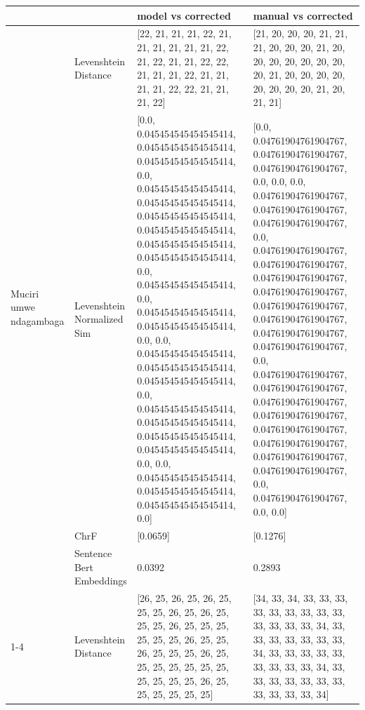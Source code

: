 \begin{tabular}{llll}
\toprule
 &  & model vs corrected & manual vs corrected \\
\midrule
\multirow[t]{4}{*}{Muciri umwe ndagambaga} & Levenshtein Distance & [22, 21, 21, 21, 22, 21, 21, 21, 21, 21, 21, 22, 21, 22, 21, 21, 22, 22, 21, 21, 21, 22, 21, 21, 21, 21, 22, 22, 21, 21, 21, 22] & [21, 20, 20, 20, 21, 21, 21, 20, 20, 20, 21, 20, 20, 20, 20, 20, 20, 20, 20, 21, 20, 20, 20, 20, 20, 20, 20, 20, 21, 20, 21, 21] \\
 & Levenshtein Normalized Sim & [0.0, 0.045454545454545414, 0.045454545454545414, 0.045454545454545414, 0.0, 0.045454545454545414, 0.045454545454545414, 0.045454545454545414, 0.045454545454545414, 0.045454545454545414, 0.045454545454545414, 0.0, 0.045454545454545414, 0.0, 0.045454545454545414, 0.045454545454545414, 0.0, 0.0, 0.045454545454545414, 0.045454545454545414, 0.045454545454545414, 0.0, 0.045454545454545414, 0.045454545454545414, 0.045454545454545414, 0.045454545454545414, 0.0, 0.0, 0.045454545454545414, 0.045454545454545414, 0.045454545454545414, 0.0] & [0.0, 0.04761904761904767, 0.04761904761904767, 0.04761904761904767, 0.0, 0.0, 0.0, 0.04761904761904767, 0.04761904761904767, 0.04761904761904767, 0.0, 0.04761904761904767, 0.04761904761904767, 0.04761904761904767, 0.04761904761904767, 0.04761904761904767, 0.04761904761904767, 0.04761904761904767, 0.04761904761904767, 0.0, 0.04761904761904767, 0.04761904761904767, 0.04761904761904767, 0.04761904761904767, 0.04761904761904767, 0.04761904761904767, 0.04761904761904767, 0.04761904761904767, 0.0, 0.04761904761904767, 0.0, 0.0] \\
 & ChrF & [0.0659] & [0.1276] \\
 & Sentence Bert Embeddings & 0.0392 & 0.2893 \\
\cline{1-4}
\multirow[t]{4}{*}{Itheru ritirutagirwo mugui} & Levenshtein Distance & [26, 25, 26, 25, 26, 25, 25, 25, 26, 25, 26, 25, 25, 25, 26, 25, 25, 25, 25, 25, 25, 26, 25, 25, 26, 25, 25, 25, 26, 25, 25, 25, 25, 25, 25, 25, 25, 25, 25, 25, 26, 25, 25, 25, 25, 25, 25] & [34, 33, 34, 33, 33, 33, 33, 33, 33, 33, 33, 33, 33, 33, 33, 33, 34, 33, 33, 33, 33, 33, 33, 33, 34, 33, 33, 33, 33, 33, 33, 33, 33, 33, 34, 33, 33, 33, 33, 33, 33, 33, 33, 33, 33, 33, 34] \\

\end{tabular}
